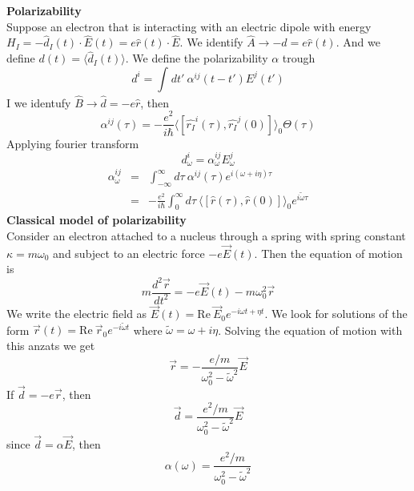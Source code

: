 \documentclass[12pt,a4paper]{article}
\newcommand{\integral}[3]{\int_{#1}^{#2} d #3 \ } %
\begin{document}
\textbf{Polarizability}\\
Suppose an electron that is interacting with an electric dipole with energy $H_I = -\hat{d}_I(t) \cdot \hat{E}(t) = e\hat{r}(t)\cdot\hat{E}$. We identify $\hat{A}\rightarrow -\hat{d}= e\hat{r}(t)$. And we define $d(t) = \langle \hat{d}_I(t) \rangle$. We define the polarizability $\alpha$ trough
\begin{equation}
	d^i = \integral{}{}{t'} \alpha^{ij}(t-t')E^j(t')
\end{equation}
I we identufy $\hat{B} \rightarrow \hat{d}=-e\hat{r}$, then
 \begin{equation}
 	\alpha^{ij}(\tau) = -\frac{e^2}{i\hbar}\langle [\hat{r_I}^i(\tau),\hat{r_I}^j(0)]\rangle_0 \Theta(\tau)
 \end{equation}
Applying fourier transform 
\begin{equation}
	d_{\omega}^i = \alpha_{\omega}^{ij} E_{\omega}^j
\end{equation}
\begin{eqnarray}
	\alpha_{\omega}^{ij} & = & \integral{-\infty}{\infty}{\tau} \alpha^{ij}(\tau) e^{i(\omega+i\eta)\tau}\\
	& = & -\frac{e^2}{i\hbar}\integral{0}{\infty}{\tau} \langle [\hat{r}(\tau),\hat{r}(0)]\rangle_0 e^{i\tilde \omega \tau}
\end{eqnarray}
\textbf{Classical model of polarizability}\\
Consider an electron attached to a nucleus through a spring with spring constant $\kappa = m\omega_0$ and subject to an electric force $-e\vec{E}(t) $. Then the equation of motion is
\begin{equation}
	m\frac{d^2 \vec{r}}{dt^2} = - e\vec{E}(t)-m\omega_0^2\vec{r}
\end{equation} 
We write the electric field as $\vec{E}(t) = \text{Re} \ \vec{E}_0 e^{-i\omega t + \eta t}$. We look for solutions of the form $\vec{r}(t) = \text{Re} \  \vec{r}_0 e^{-i\tilde\omega t}$ where $\tilde{\omega} = \omega + i\eta$. Solving the equation of motion with this anzats we get 
\begin{equation}
	\vec{r} = -\frac{e/m}{\omega_0^2 - \tilde{\omega}^2}\vec{E}
\end{equation}
If $\vec{d} = -e\vec{r}$, then
\begin{equation}
	\vec{d} = \frac{e^2/m}{\omega_0^2 - \tilde{\omega}^2}\vec{E}
\end{equation}
since $\vec{d} = \alpha \vec{E}$, then
\begin{equation}
	\alpha(\omega) = \frac{e^2/m}{\omega_0^2 - \tilde{\omega}^2}
\end{equation}
\end{document}
